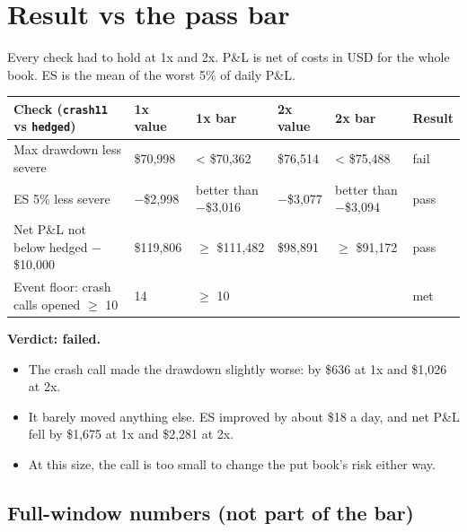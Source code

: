 \documentclass{article}
\begin{document}
\section{Result vs the pass bar}

Every check had to hold at 1x and 2x. P\&L is net of costs in USD for the whole book. ES is the mean of the worst 5\% of daily P\&L.

\begin{center}\small
\begin{tabularx}{\linewidth}{>{\raggedright\arraybackslash}X l >{\raggedright\arraybackslash}X l >{\raggedright\arraybackslash}X l}
\toprule
\textbf{Check (\texttt{crash11} vs \texttt{hedged})} & \textbf{1x value} & \textbf{1x bar} & \textbf{2x value} & \textbf{2x bar} & \textbf{Result} \\
\midrule
Max drawdown less severe & \$70,998 & < \$70,362 & \$76,514 & < \$75,488 & fail \\
ES 5\% less severe & \ensuremath{-}\$2,998 & better than \ensuremath{-}\$3,016 & \ensuremath{-}\$3,077 & better than \ensuremath{-}\$3,094 & pass \\
Net P\&L not below hedged \ensuremath{-} \$10,000 & \$119,806 & \ensuremath{\geq} \$111,482 & \$98,891 & \ensuremath{\geq} \$91,172 & pass \\
Event floor: crash calls opened \ensuremath{\geq} 10 & 14 & \ensuremath{\geq} 10 &  &  & met \\
\bottomrule
\end{tabularx}
\end{center}

\textbf{Verdict: failed.}

\begin{itemize}

\item The crash call made the drawdown slightly worse: by \$636 at 1x and \$1,026 at 2x.

\item It barely moved anything else. ES improved by about \$18 a day, and net P\&L fell by \$1,675 at 1x and \$2,281 at 2x.

\item At this size, the call is too small to change the put book's risk either way.

\end{itemize}

\subsection{Full-window numbers (not part of the bar)}
\end{document}

